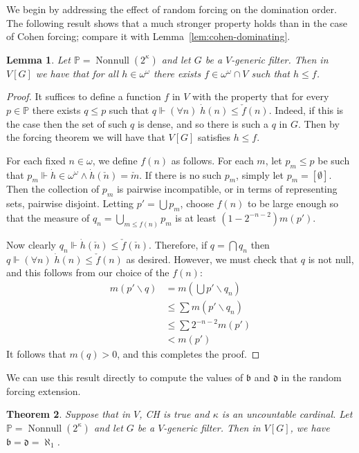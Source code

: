 \documentclass[11pt,oneside,a4paper]{amsbook}
\newcommand{\PP}{\mathbb P}
\newcommand{\forces}{\Vdash}
\DeclareMathOperator{\Nonnull}{Nonnull}
\theoremstyle{definition}
\theoremstyle{plain}
\newtheorem{theorem}{Theorem}[section]
\newtheorem{lemma}[theorem]{Lemma}
\theoremstyle{definition}
\theoremstyle{remark}
\numberwithin{equation}{section}
\numberwithin{figure}{section}
\begin{document}
We begin by addressing the effect of random forcing on the domination order. The following result shows that a much stronger property holds than in the case of Cohen forcing; compare it with Lemma~\ref{lem:cohen-dominating}.

\begin{lemma}
  Let $\PP=\Nonnull(2^\kappa)$ and let $G$ be a $V$-generic filter. Then in $V[G]$ we have that for all $h\in\omega^\omega$ there exists $f\in \omega^\omega\cap V$ such that $h\leq f$.
\end{lemma}

\begin{proof}
  It suffices to define a function $f$ in $V$ with the property that for every $p\in\PP$ there exists $q\leq p$ such that $q\forces(\forall n)\;\dot h(n)\leq\check f(n)$. Indeed, if this is the case then the set of such $q$ is dense, and so there is such a $q$ in $G$. Then by the forcing theorem we will have that $V[G]$ satisfies $h\leq f$.

  For each fixed $n\in\omega$, we define $f(n)$ as follows. For each $m$, let $p_m\leq p$ be such that $p_m\forces\dot h\in\omega^\omega\wedge\dot h(\check n)=\check m$. If there is no such $p_m$, simply let $p_m=[\emptyset]$. Then the collection of $p_m$ is pairwise incompatible, or in terms of representing sets, pairwise disjoint. Letting $p'=\bigcup p_m$, choose $f(n)$ to be large enough so that the measure of $q_n=\bigcup_{m\leq f(n)}p_m$ is at least $(1-2^{-n-2})m(p')$.

  Now clearly $q_n\forces\dot h(\check n)\leq\check f(\check n)$. Therefore, if $q=\bigcap q_n$ then $q\forces(\forall n)\;\dot h(n)\leq\check f(n)$ as desired. However, we must check that $q$ is not null, and this follows from our choice of the $f(n)$:
  \begin{align*}
    m(p'\smallsetminus q)&=m(\bigcup p'\smallsetminus q_n)\\
                        &\leq\sum m(p'\smallsetminus q_n)\\
                        &\leq\sum 2^{-n-2}m(p')\\
                        &<m(p')
  \end{align*}
  It follows that $m(q)>0$, and this completes the proof.
\end{proof}

We can use this result directly to compute the values of $\mathfrak b$ and $\mathfrak d$ in the random forcing extension.

\begin{theorem}
  \label{thm:random-bd}
  Suppose that in $V$, CH is true and $\kappa$ is an uncountable cardinal. Let $\PP=\Nonnull(2^\kappa)$ and let $G$ be a $V$-generic filter. Then in $V[G]$, we have $\mathfrak b=\mathfrak d=\aleph_1$.
\end{theorem}
\end{document}
